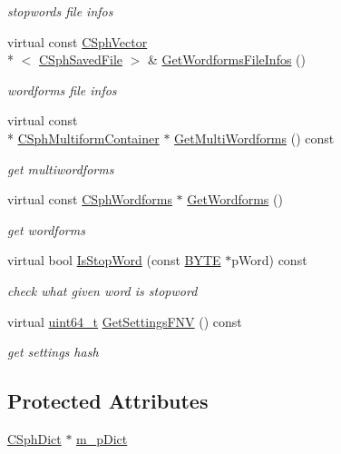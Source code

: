 \begin{DoxyCompactItemize}
\begin{DoxyCompactList}\small\item\em stopwords file infos \end{DoxyCompactList}\item 
virtual const \hyperlink{classCSphVector}{C\-Sph\-Vector}\\*
$<$ \hyperlink{structCSphSavedFile}{C\-Sph\-Saved\-File} $>$ \& \hyperlink{classCSphDictTraits_ad80fb5c315d6c2224310188e13cdeb95}{Get\-Wordforms\-File\-Infos} ()
\begin{DoxyCompactList}\small\item\em wordforms file infos \end{DoxyCompactList}\item 
virtual const \\*
\hyperlink{structCSphMultiformContainer}{C\-Sph\-Multiform\-Container} $\ast$ \hyperlink{classCSphDictTraits_af4df5aa56d3c33357197aab1172d91dd}{Get\-Multi\-Wordforms} () const 
\begin{DoxyCompactList}\small\item\em get multiwordforms \end{DoxyCompactList}\item 
virtual const \hyperlink{structCSphWordforms}{C\-Sph\-Wordforms} $\ast$ \hyperlink{classCSphDictTraits_ad8ca05d264526c65134b603c7591b8d0}{Get\-Wordforms} ()
\begin{DoxyCompactList}\small\item\em get wordforms \end{DoxyCompactList}\item 
virtual bool \hyperlink{classCSphDictTraits_a6a88448fd540f8705720f6283d55d40f}{Is\-Stop\-Word} (const \hyperlink{sphinxstd_8h_a4ae1dab0fb4b072a66584546209e7d58}{B\-Y\-T\-E} $\ast$p\-Word) const 
\begin{DoxyCompactList}\small\item\em check what given word is stopword \end{DoxyCompactList}\item 
virtual \hyperlink{sphinxstd_8h_aaa5d1cd013383c889537491c3cfd9aad}{uint64\-\_\-t} \hyperlink{classCSphDictTraits_aa090d1ed30b3f9f830b7e66fc1883c0f}{Get\-Settings\-F\-N\-V} () const 
\begin{DoxyCompactList}\small\item\em get settings hash \end{DoxyCompactList}\end{DoxyCompactItemize}
\subsection*{Protected Attributes}
\begin{DoxyCompactItemize}
\item 
\hyperlink{classCSphDict}{C\-Sph\-Dict} $\ast$ \hyperlink{classCSphDictTraits_a69bd0effa15e9a57fc8c3433b4d75f8c}{m\-\_\-p\-Dict}
\end{DoxyCompactItemize}
